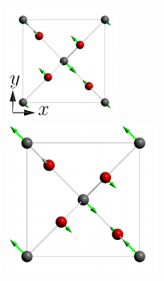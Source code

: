 \begin{figure}[t]
\begin{subcaptionblock}{0.3\linewidth}
\includegraphics[width=\linewidth]{figures/E1u/E1u.pdf}
\end{subcaptionblock}\hfill
\begin{subcaptionblock}{0.3\linewidth}
\centering
\includegraphics[width=\linewidth]{figures/E2u/E2u.pdf}

\end{subcaptionblock}
\end{figure}
